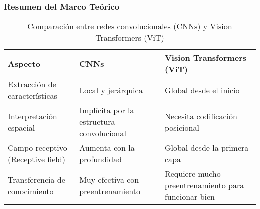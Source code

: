\begin{frame}
\frametitle{Resumen del Marco Teórico}
\begin{table}[h!]
    \centering
    \fontsize{8}{9}\selectfont
    \begin{tabular}{|p{2.5cm}|p{3cm}|p{3cm}|}
        \hline
        \textbf{Aspecto} & \textbf{CNNs} & \textbf{Vision Transformers (ViT)} \\
        \hline
        Extracción de características & Local y jerárquica & Global desde el inicio \\
        \hline
        Interpretación espacial & Implícita por la estructura convolucional & Necesita codificación posicional \\
        \hline
        Campo receptivo (Receptive field) & Aumenta con la profundidad & Global desde la primera capa \\
        \hline
        Transferencia de conocimiento & Muy efectiva con preentrenamiento & Requiere mucho preentrenamiento para funcionar bien \\
        \hline
    \end{tabular}
    \caption{Comparación entre redes convolucionales (CNNs) y Vision Transformers (ViT)}
    \label{tab:comparacion_cnns_vit}
\end{table}
\end{frame}
